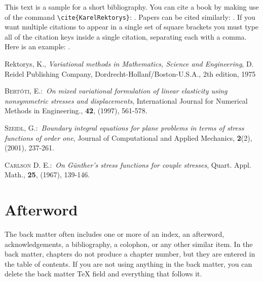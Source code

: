 \documentclass[a4paper]{book}%
\begin{document}
This text is a sample for a short bibliography. You can cite a book by making use of
the command \verb"\cite{KarelRektorys}": \cite{KarelRektorys}. Papers can be cited
similarly: \cite{Bertoti97}. If you want multiple citations to appear in a single set
of square brackets you must type all of the citation keys inside a single citation,
separating each with a comma. Here is an example: \cite{Bertoti97, Szeidl2001,
Carlson67}.

\begin{thebibliography}{9}
Rektorys, K., \textit{Variational methods in Mathematics,
Science and Engineering}, D. Reidel Publishing Company,
Dordrecht-Hollanf/Boston-U.S.A., 2th edition, 1975

 \textsc{Bert\'{o}ti, E.}:\ \textit{On mixed variational formulation
of linear elasticity using nonsymmetric stresses and displacements}, International
Journal for Numerical Methods in Engineering., \textbf{42}, (1997), 561-578.

 \textsc{Szeidl, G.}:\ \textit{Boundary integral equations for
plane problems in terms of stress functions of order one}, Journal of Computational and
Applied Mechanics, \textbf{2}(2), (2001), 237-261.

  \textsc{Carlson D. E.}:\ \textit{On G\"{u}nther's stress functions
for couple stresses}, Quart. Appl. Math., \textbf{25}, (1967), 139-146.
\end{thebibliography}

\backmatter

\chapter{Afterword}

The back matter often includes one or more of an index, an afterword,
acknowledgements, a bibliography, a colophon, or any other similar item. In
the back matter, chapters do not produce a chapter number, but they are
entered in the table of contents. If you are not using anything in the back
matter, you can delete the back matter TeX field and everything that follows it.
\end{document}
